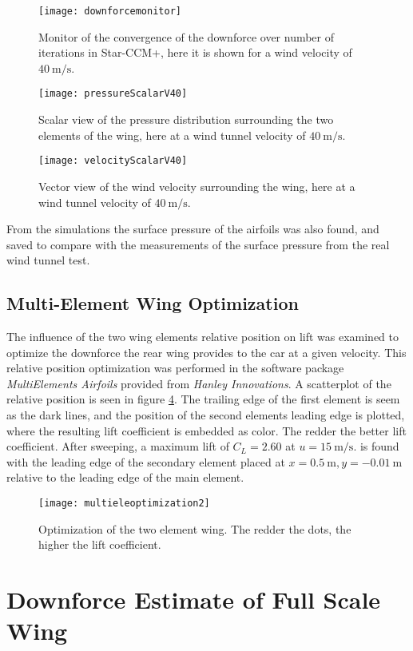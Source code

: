   \begin{figure}
    \texttt{[image: downforcemonitor]}
    \caption{Monitor of the convergence of the downforce over number of iterations in Star-CCM+, here it is shown for a wind velocity of $\SI{40}{\metre\per\second}$.}
    \label{fig:downforcemonitor}
  \end{figure}

  \begin{figure}
    \texttt{[image: pressureScalarV40]}
    \caption{Scalar view of the pressure distribution surrounding the two elements of the wing, here at a wind tunnel velocity of $\SI{40}{\metre\per\second}$.}
    \label{fig:pressureScalarV40}
  \end{figure}

  \begin{figure}
    \texttt{[image: velocityScalarV40]}
    \caption{Vector view of the wind velocity surrounding the wing, here at a wind tunnel velocity of $\SI{40}{\metre\per\second}$.}
    \label{fig:velocityScalarV40}
  \end{figure}

  From the simulations the surface pressure of the airfoils was also found, and saved to compare with the measurements of the surface pressure from the real wind tunnel test.

  


  \subsection{Multi-Element Wing Optimization}
  The influence of the two wing elements relative position on lift was examined to optimize the downforce the rear wing provides to the car at a given velocity. This relative position optimization was performed in the software package \emph{MultiElements Airfoils} provided from \emph{Hanley Innovations}. A scatterplot of the relative position is seen in figure \ref{fig:multieleoptimization}. The trailing edge of the first element is seem as the dark lines, and the position of the second elements leading edge is plotted, where the resulting lift coefficient is embedded as color. The redder the better lift coefficient. After sweeping, a maximum lift of $C_L = 2.60$  at $u = \SI{15}{\metre\per\second}$. is found with the leading edge of the secondary element placed at $x=\SI{0.5}{\metre},y=\SI{-0.01}{\metre}$ relative to the leading edge of the main element.

  \begin{figure}
    \texttt{[image: multieleoptimization2]}
    \caption{Optimization of the two element wing. The redder the dots, the higher the lift coefficient.}
    \label{fig:multieleoptimization}
  \end{figure}

\section{Downforce Estimate of Full Scale Wing}
